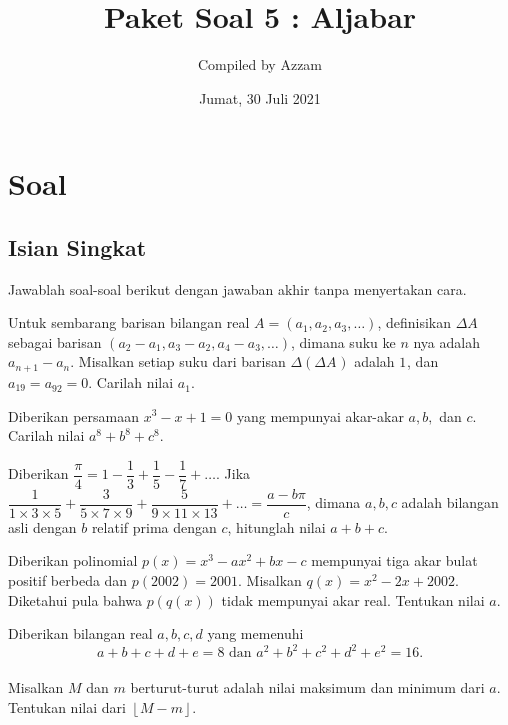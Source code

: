 \documentclass[11pt]{scrartcl}
\begin{document}
	\title{Paket Soal 5 : Aljabar} %
	\date{Jumat, 30 Juli 2021}
	\author{Compiled by Azzam}
	\maketitle
	\newpage
	
	\section{Soal}
\subsection{Isian Singkat}
Jawablah soal-soal berikut dengan jawaban akhir tanpa menyertakan cara.

	\begin{soalbaru}
		Untuk sembarang barisan bilangan real $A=(a_1,a_2,a_3,\ldots)$, definisikan $\Delta A^{}_{}$ sebagai barisan $(a_2-a_1,a_3-a_2,a_4-a_3,\ldots)$, dimana suku ke $n$ nya adalah  $a_{n+1}-a_n^{}$. Misalkan setiap suku dari barisan  $\Delta(\Delta A^{}_{})$ adalah $1^{}_{}$, dan $a_{19}=a_{92}^{}=0$. Carilah nilai $a_1^{}$.
	\end{soalbaru}
	
	\begin{soalbaru}
		Diberikan persamaan $x^3-x+1=0$ yang mempunyai akar-akar $a,b,$ dan $c$. Carilah nilai $a^8+b^8+c^8$.
	\end{soalbaru}
	
	\begin{soalbaru}
			Diberikan $\dfrac{\pi}{4} = 1 - \dfrac{1}{3}+\dfrac{1}{5}-\dfrac{1}{7}+\dots$. Jika  $\dfrac{1}{1 \times 3 \times 5}+\dfrac{3}{5 \times 7 \times 9}+\dfrac{5}{9 \times 11 \times 13}+\dots = \dfrac{a-b\pi}{c}$, dimana $a,b,c$ adalah bilangan asli dengan $b$ relatif prima dengan $c$, hitunglah nilai $a+b+c$.
		\end{soalbaru}
	
	\begin{soalbaru}
		Diberikan polinomial $p(x)=x^3-ax^2+bx-c$ mempunyai tiga akar bulat positif berbeda dan $p(2002)=2001$. Misalkan $q(x)=x^2-2x+2002$. Diketahui pula bahwa $p(q(x))$ tidak mempunyai akar real. Tentukan nilai $a$.
	\end{soalbaru}
	
	\begin{soalbaru}
		Diberikan bilangan real $a,b,c,d$ yang memenuhi\\[-20pt] $$a+b+c+d+e=8 \text{ dan }a^2+b^2+c^2+d^2+e^2=16.$$\\[-25pt] Misalkan $M$ dan $m$ berturut-turut adalah nilai maksimum dan minimum dari $a$. Tentukan nilai dari $\left \lfloor M-m \right \rfloor$.  %
	\end{soalbaru}
	
\end{document}

